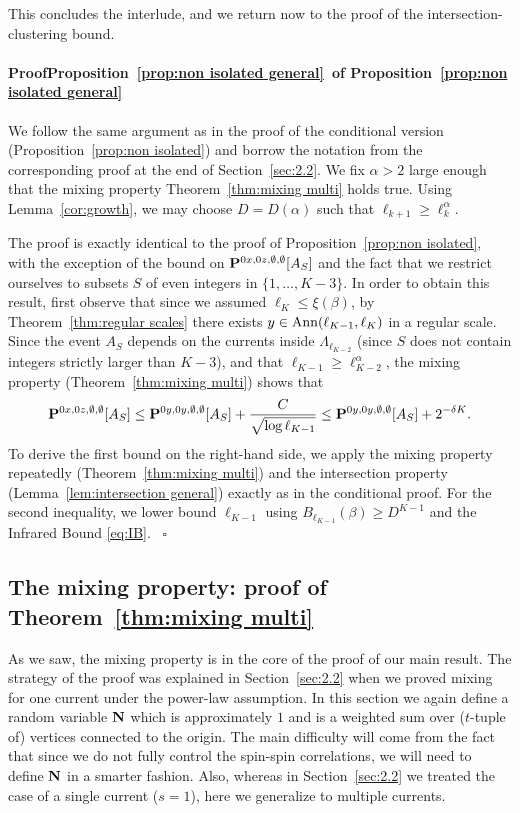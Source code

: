 \documentclass[a4paper,oneside,11pt]{article}
\newcommand{\be}[1]{\begin{equation}\label{#1}}
\newcommand{\ee}{\end{equation}}
\numberwithin{equation}{section}
\numberwithin{equation}{section}
\numberwithin{equation}{section}
\newenvironment{proof}[1][\relax]%
  {\paragraph{Proof\ifx#1\relax\else~of #1\fi}}%
  {~\hfill$\square$\par\bigskip}
\def\be{\begin{equation}}
\def\ee{\end{equation}}
\begin{document}
This concludes the interlude, and we  return now to the proof of the intersection-clustering bound. 

\begin{proof}[Proposition~\ref{prop:non isolated general}]
We follow the same argument as in the proof of the conditional version (Proposition~\ref{prop:non isolated}) and borrow the notation from the corresponding proof at the end of Section~\ref{sec:2.2}. We fix $\alpha>2$ large enough that the mixing property Theorem~\ref{thm:mixing multi} holds true. Using Lemma~\ref{cor:growth}, we may choose $D=D(\alpha)$ such that $\ell_{k+1}\ge \ell_k^\alpha$. 

The proof is exactly identical to the proof of Proposition~\ref{prop:non isolated}, with the exception of the bound on ${\bf P}^{0x,0z,\emptyset,\emptyset}[A_S]$ and the fact that we restrict ourselves to subsets $S$ of even integers in $\{1,\dots,K-3\}$. In order to obtain this result, first observe that since we assumed $\ell_K\le \xi(\beta)$, by Theorem~\ref{thm:regular scales} there exists $y\in {\rm Ann}(\ell_{K-1},\ell_{K})$ in a regular scale. Since the event $A_S$ depends on the currents inside $\Lambda_{\ell_{K-2}}$ (since $S$ does not contain integers strictly larger than $K-3$), and that $\ell_{K-1}\ge \ell_{K-2}^\alpha$, the mixing property (Theorem~\ref{thm:mixing multi}) shows that
\be
{\bf P}^{0x,0z,\emptyset,\emptyset}[A_S]\le {\bf P}^{0y,0y,\emptyset,\emptyset}[A_S]+\frac{C}{\sqrt{\log \ell_{K-1}}}\le {\bf P}^{0y,0y,\emptyset,\emptyset}[A_S]+2^{-\delta K}.
\ee
To derive the first bound on the right-hand side, we apply the mixing property repeatedly (Theorem~\ref{thm:mixing multi}) and the intersection property (Lemma~\ref{lem:intersection general}) exactly as in the conditional proof. For the second inequality, we lower bound $\ell_{K-1}$ using $B_{\ell_{K-1}}(\beta)\ge D^{K-1}$ and the Infrared Bound \eqref{eq:IB}.
\end{proof}




\subsection{The mixing property: proof of Theorem~\ref{thm:mixing multi}}\label{sec:4.2}


As we saw, the mixing property is in the core of the proof of our main result.  The strategy of the proof was explained in Section~\ref{sec:2.2} when we proved mixing for one current under the power-law assumption.  In this section we  again define a random variable ${\bf N}$ which is approximately $1$  and is a weighted sum over ($t$-tuple of) vertices connected to the origin. The main difficulty will come from the fact that since we do not fully control the spin-spin correlations, we  will need to define ${\bf N}$ in a smarter fashion. Also, whereas in Section~\ref{sec:2.2} we  treated the case of a single current ($s=1$), here we generalize to multiple currents.
\end{document}
